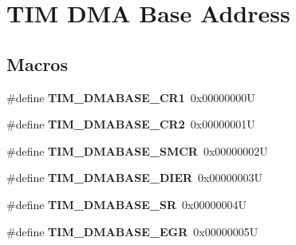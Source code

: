 \hypertarget{group___t_i_m___d_m_a___base__address}{}\section{T\+IM D\+MA Base Address}
\label{group___t_i_m___d_m_a___base__address}
\subsection*{Macros}
\begin{DoxyCompactItemize}
\item 
\mbox{\label{group___t_i_m___d_m_a___base__address_ga97bbe74e5ae8680c020a6b0f760d8909}} 
\#define {\bfseries T\+I\+M\+\_\+\+D\+M\+A\+B\+A\+S\+E\+\_\+\+C\+R1}~0x00000000U
\item 
\mbox{\label{group___t_i_m___d_m_a___base__address_ga53d60ce92015bb60d608e60c45b1fdda}} 
\#define {\bfseries T\+I\+M\+\_\+\+D\+M\+A\+B\+A\+S\+E\+\_\+\+C\+R2}~0x00000001U
\item 
\mbox{\label{group___t_i_m___d_m_a___base__address_ga184ad86a4c6d48263f57d3e7106675c4}} 
\#define {\bfseries T\+I\+M\+\_\+\+D\+M\+A\+B\+A\+S\+E\+\_\+\+S\+M\+CR}~0x00000002U
\item 
\mbox{\label{group___t_i_m___d_m_a___base__address_ga137d2e3858ae68333646fea6e04503da}} 
\#define {\bfseries T\+I\+M\+\_\+\+D\+M\+A\+B\+A\+S\+E\+\_\+\+D\+I\+ER}~0x00000003U
\item 
\mbox{\label{group___t_i_m___d_m_a___base__address_gaf0da2213e3e7b6aaaa9b738ec85abc02}} 
\#define {\bfseries T\+I\+M\+\_\+\+D\+M\+A\+B\+A\+S\+E\+\_\+\+SR}~0x00000004U
\item 
\mbox{\label{group___t_i_m___d_m_a___base__address_gaff6d230aafb918047d62e877d21b3bdc}} 
\#define {\bfseries T\+I\+M\+\_\+\+D\+M\+A\+B\+A\+S\+E\+\_\+\+E\+GR}~0x00000005U
\item 
\mbox{\label{group___t_i_m___d_m_a___base__address_gac94d74bf77d5ce139c7fa6e0b8c2da44}} 

\end{DoxyCompactItemize}
